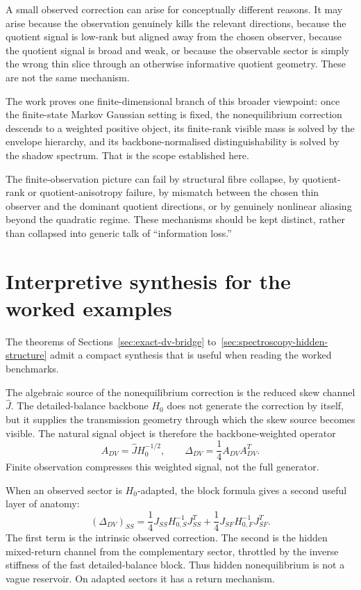 \documentclass[11pt,a4paper]{article}
\numberwithin{equation}{section}
\theoremstyle{thmcompact}
\theoremstyle{remark}
\begin{document}
A small observed correction can arise for conceptually different reasons. It may arise because the observation genuinely kills the relevant directions, because the quotient signal is low-rank but aligned away from the chosen observer, because the quotient signal is broad and weak, or because the observable sector is simply the wrong thin slice through an otherwise informative quotient geometry. These are not the same mechanism.

The work proves one finite-dimensional branch of this broader viewpoint: once the finite-state Markov Gaussian setting is fixed, the nonequilibrium correction descends to a weighted positive object, its finite-rank visible mass is solved by the envelope hierarchy, and its backbone-normalised distinguishability is solved by the shadow spectrum. That is the scope established here.

The finite-observation picture can fail by structural fibre collapse, by quotient-rank or quotient-anisotropy failure, by mismatch between the chosen thin observer and the dominant quotient directions, or by genuinely nonlinear aliasing beyond the quadratic regime. These mechanisms should be kept distinct, rather than collapsed into generic talk of ``information loss.''

\section{Interpretive synthesis for the worked examples}
\label{app:hidden_engine_synthesis}

The theorems of Sections~\ref{sec:exact-dv-bridge} to~\ref{sec:spectroscopy-hidden-structure} admit a compact synthesis that is useful when reading the worked benchmarks.

The algebraic source of the nonequilibrium correction is the reduced skew channel \(\widehat J\). The detailed-balance backbone \(H_0\) does not generate the correction by itself, but it supplies the transmission geometry through which the skew source becomes visible. The natural signal object is therefore the backbone-weighted operator
\begin{equation}
A_{DV}=\widehat J H_0^{-1/2},
\qquad
\Delta_{DV}=\frac14 A_{DV}A_{DV}^T.
\end{equation}
Finite observation compresses this weighted signal, not the full generator.

When an observed sector is \(H_0\)-adapted, the block formula gives a second useful layer of anatomy:
\begin{equation}
(\Delta_{DV})_{SS}
=
\frac14 J_{SS}H_{0,S}^{-1}J_{SS}^T
+
\frac14 J_{SF}H_{0,F}^{-1}J_{SF}^T.
\end{equation}
The first term is the intrinsic observed correction. The second is the hidden mixed-return channel from the complementary sector, throttled by the inverse stiffness of the fast detailed-balance block. Thus hidden nonequilibrium is not a vague reservoir. On adapted sectors it has a return mechanism.
\end{document}
